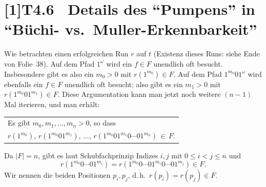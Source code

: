 \documentclass[fontsize=11pt, twoside=false, numbers=autoenddot]{scrbook}
\begin{document}
\section*{\scalebox{.96}[1]{T4.6~ Details des "`Pumpens"' in "`Büchi- vs.\ Muller-Erkennbarkeit"'}}

Wie betrachten einen erfolgreichen Run $r$ auf $t$ (Existenz dieses Runs: siehe Ende von Folie~38).
Auf dem Pfad $1^\omega$ wird ein $f \in F$ unendlich oft besucht.
Insbesondere gibt es also ein $m_0 > 0$ mit $r(1^{m_0}) \in F$.
Auf dem Pfad $1^{m_0}01^\omega$ wird ebenfalls ein $f \in F$ unendlich oft besucht;
also gibt es ein $m_1 > 0$ mit $r(1^{m_0}01^{m_1}) \in F$.
Diese Argumentation kann man jetzt noch weitere $(n-1)$ Mal iterieren,
und man erhält:
%
\begin{center}
  \begin{tabular}{@{}l@{}}
    Es gibt $m_0,m_1,\dots,m_n > 0$, so dass\\[2pt]
    $r(1^{m_0}),\, r(1^{m_0}01^{m_1}),\, \dots,\, r(1^{m_0}01^{m_1}0\cdots01^{m_n}) \,\in\, F$.
  \end{tabular}
\end{center}
%
Da $|F|=n$, gibt es laut Schubfachprinzip Indizes $i,j$ mit $0 \leq i < j \leq n$
und
\[
  r(1^{m_0}0\cdots01^{m_i}) = r(1^{m_0}0\cdots01^{m_i}0\cdots01^{m_j}) \in F.
\]
Wir nennen die beiden Positionen $p_i,p_j$, d.\,h.\ $r(p_i) = r(p_j) \in F$.
\end{document}
